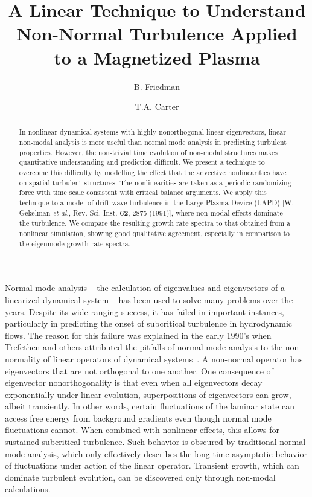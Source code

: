 \documentclass[letter,scriptaddress,twocolumn, prl,showkeys]{revtex4}
\begin{document}
\title{A Linear Technique to Understand Non-Normal Turbulence Applied to a Magnetized Plasma}

\author{B. Friedman}

\author{T.A. Carter}




\begin{abstract}
In nonlinear dynamical systems with highly nonorthogonal linear eigenvectors, linear non-modal analysis is more useful than normal mode analysis in predicting turbulent properties. 
However, the non-trivial time evolution of non-modal structures makes quantitative understanding and prediction difficult. 
We present a technique to overcome this difficulty by modelling the effect that the advective nonlinearities have on spatial turbulent structures. 
The nonlinearities are taken as a periodic randomizing force with
time scale consistent with critical balance arguments. We apply this technique to a model of drift wave turbulence in the Large Plasma Device (LAPD) 
[W. Gekelman \emph{et al.}, Rev. Sci. Inst. {\bf 62}, 2875 (1991)], where non-modal effects dominate the turbulence.
We compare the resulting growth rate spectra to that obtained from a nonlinear simulation, showing good qualitative agreement, especially in comparison to the eigenmode growth rate spectra.
\end{abstract}

\maketitle

Normal mode analysis -- the calculation of eigenvalues and eigenvectors of a linearized dynamical system -- has been used to solve many problems over the years.
Despite its wide-ranging success, it has failed in important instances, particularly in predicting the onset of subcritical turbulence in hydrodynamic flows. 
The reason for this failure was explained in the early 1990's when Trefethen and others attributed the pitfalls of normal mode analysis to the non-normality of linear operators of
dynamical systems~\cite{trefethen1993,schmid2007}. A non-normal operator has 
eigenvectors that are not orthogonal to one another. One consequence of eigenvector nonorthogonality is that even when all eigenvectors decay exponentially under linear evolution, 
superpositions of eigenvectors can grow, albeit transiently.
In other words, certain fluctuations of the laminar state can access free energy from background gradients even though normal mode fluctuations cannot.
When combined with nonlinear effects, this allows for sustained subcritical turbulence.
Such behavior is obscured by traditional normal mode analysis, which only effectively describes the long time asymptotic behavior of fluctuations under  
action of the linear operator. Transient growth, which can dominate turbulent evolution, can be discovered only through non-modal calculations.
\end{document}
